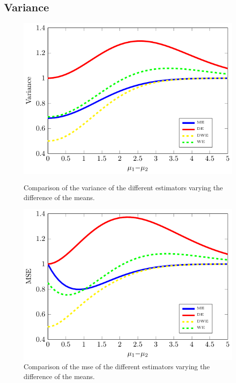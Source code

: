 \subsection{Variance}
\begin{figure}
\centering
	\begin{minipage}{0.45\textwidth}
	\centering
	\includegraphics[scale=0.7]{./img/variance.pdf}
    \caption[Variance analysis in WE]{Comparison of the variance of the different estimators varying the difference of the means.}\label{F:variance}
	\end{minipage}
	  \hfill
	\begin{minipage}{0.45\textwidth}
	\centering	
	\includegraphics[scale=0.7]{./img/mse.pdf}
	\caption[MSE analysis in WE]{Comparison of the \gls{mse} of the different estimators varying the difference of the means.}\label{F:mse}
	\end{minipage}
	\label{F:Variance_mse}
\end{figure}

